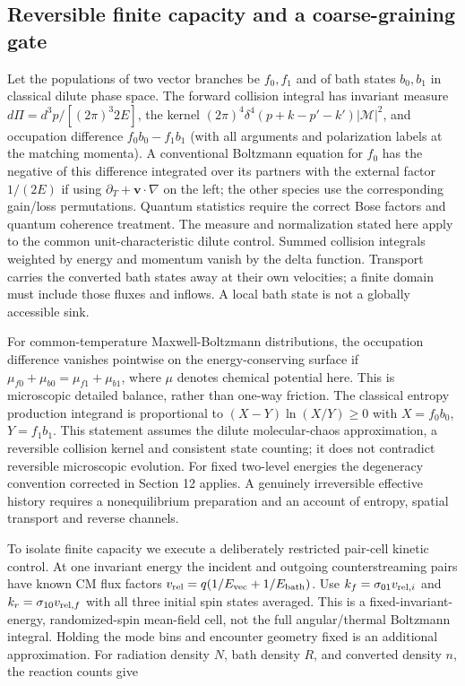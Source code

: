 \documentclass[
  11pt,
  twoside]{article}
\begin{document}
\subsection{Reversible finite capacity and a coarse-graining
gate}\label{reversible-finite-capacity-and-a-coarse-graining-gate}

Let the populations of two vector branches be \(f_0,f_1\) and of bath
states \(b_0,b_1\) in classical dilute phase space. The forward
collision integral has invariant measure \(d\Pi=d^3p/[(2\pi)^3 2E]\),
the kernel \((2\pi)^4\delta^4(p+k-p'-k')|\mathcal M|^2\), and occupation
difference \(f_0 b_0-f_1 b_1\) (with all arguments and polarization
labels at the matching momenta). A conventional Boltzmann equation for
\(f_0\) has the negative of this difference integrated over its partners
with the external factor \(1/(2E)\) if using
\(\partial_T+\mathbf v\cdot\nabla\) on the left; the other species use
the corresponding gain/loss permutations. Quantum statistics require the
correct Bose factors and quantum coherence treatment. The measure and
normalization stated here apply to the common unit-characteristic dilute
control. Summed collision integrals weighted by energy and momentum
vanish by the delta function. Transport carries the converted bath
states away at their own velocities; a finite domain must include those
fluxes and inflows. A local bath state is not a globally accessible
sink.

For common-temperature Maxwell-Boltzmann distributions, the occupation
difference vanishes pointwise on the energy-conserving surface if
\(\mu_{f0}+\mu_{b0}=\mu_{f1}+\mu_{b1}\), where \(\mu\) denotes chemical
potential here. This is microscopic detailed balance, rather than
one-way friction. The classical entropy production integrand is
proportional to \((X-Y)\ln(X/Y)\geq0\) with \(X=f_0b_0\), \(Y=f_1b_1\).
This statement assumes the dilute molecular-chaos approximation, a
reversible collision kernel and consistent state counting; it does not
contradict reversible microscopic evolution. For fixed two-level
energies the degeneracy convention corrected in Section 12 applies. A
genuinely irreversible effective history requires a nonequilibrium
preparation and an account of entropy, spatial transport and reverse
channels.

To isolate finite capacity we execute a deliberately restricted
pair-cell kinetic control. At one invariant energy the incident and
outgoing counterstreaming pairs have known CM flux factors
\(v_{\rm rel}=q(1/E_{\rm vec}+1/E_{\rm bath})\). Use
\(k_f=\sigma_{01}v_{{\rm rel},i}\) and
\(k_r=\sigma_{10}v_{{\rm rel},f}\) with all three initial spin states
averaged. This is a fixed-invariant-energy, randomized-spin mean-field
cell, not the full angular/thermal Boltzmann integral. Holding the mode
bins and encounter geometry fixed is an additional approximation. For
radiation density \(N\), bath density \(R\), and converted density
\(n\), the reaction counts give
\end{document}
